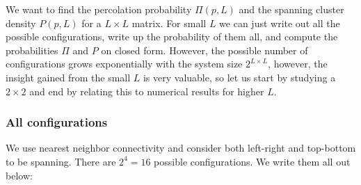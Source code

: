 \documentclass[a4paper, 11pt, notitlepage, english]{article}
\begin{document}
We want to find the percolation probability $\Pi(p, L)$ and the spanning cluster density $P(p, L)$ for a $L\times L$ matrix. For small $L$ we can just write out all the possible configurations, write up the probability of them all, and compute the probabilities $\Pi$ and $P$ on closed form. However, the possible number of configurations grows exponentially with the system size $2^{L\times L}$, however, the insight gained from the small $L$ is very valuable, so let us start by studying a $2\times 2$ and end by relating this to numerical results for higher $L$.


\subsubsection*{All configurations}
We use nearest neighbor connectivity and consider both left-right and top-bottom to be spanning. There are $2^4 = 16$ possible configurations. We write them all out below:
\end{document}
